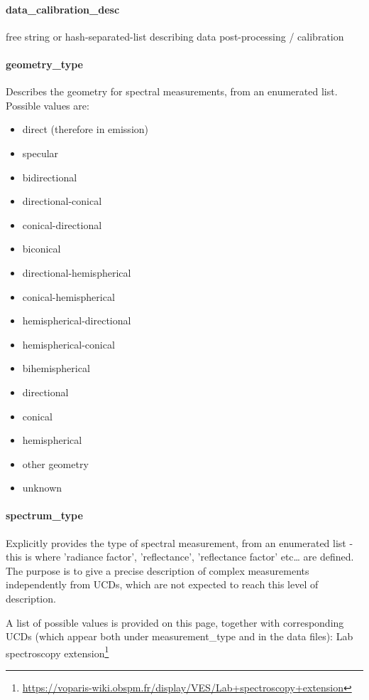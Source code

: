 \documentclass[11pt,a4paper]{ivoa}
\begin{document}
\paragraph{data\_calibration\_desc}

free string or hash-separated-list describing data post-processing / calibration

\paragraph{geometry\_type}

Describes the geometry for spectral measurements, from an enumerated list. Possible values are:

\begin{itemize}
\item direct (therefore in emission)
\item specular
\item bidirectional
\item directional-conical
\item conical-directional
\item biconical
\item directional-hemispherical
\item conical-hemispherical
\item hemispherical-directional
\item hemispherical-conical
\item bihemispherical
\item directional
\item conical
\item hemispherical
\item other geometry
\item unknown
\end{itemize}

\paragraph{spectrum\_type}

Explicitly provides the type of spectral measurement, from an enumerated list - this is where 'radiance factor', 'reflectance', 'reflectance factor' etc… are defined. The purpose is to give a precise description of complex measurements independently from UCDs, which are not expected to reach this level of description.

A list of possible values is provided on this page, together with corresponding UCDs (which appear both under measurement\_type and in the data files): Lab spectroscopy extension\footnote{\url{https://voparis-wiki.obspm.fr/display/VES/Lab+spectroscopy+extension}}
\end{document}
